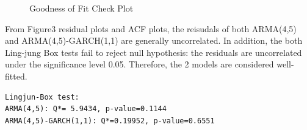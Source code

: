 \documentclass [letterpaper] {article}
\begin{document}
\begin{figure}[htp]
	\centering
	\quad
	\caption{Goodness of Fit Check Plot}
\end{figure}

From Figure3 residual plots and ACF plots, the reisudals of both ARMA(4,5) and ARMA(4,5)-GARCH(1,1)  are generally uncorrelated.  In addition, the both Ling-jung Box tests fail to reject null hypothesis: the residuals are uncorrelated under the significance level 0.05. Therefore, the 2 models are considered well-fitted.

\begin{lstlisting}
Lingjun-Box test:
ARMA(4,5): Q*= 5.9434, p-value=0.1144
ARMA(4,5)-GARCH(1,1): Q*=0.19952, p-value=0.6551
\end{lstlisting}	
\end{document}
